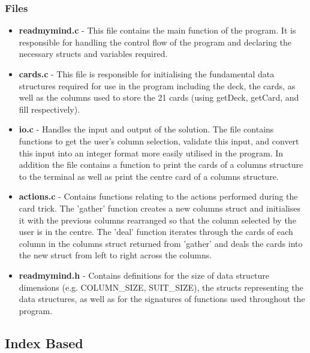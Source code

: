 \documentclass[11]{article}
\begin{document}
		\subsubsection{Files}
				\begin{itemize}
					\item \textbf{readmymind.c} - This file contains the main function of the program. It is responsible for handling the control flow of the program and declaring the necessary structs and variables required.
					\item \textbf{cards.c} - This file is responsible for initialising the fundamental data structures required for use in the program including the deck, the cards, as well as the columns used to store the 21 cards (using getDeck, getCard, and fill respectively).
					\item \textbf{io.c} - Handles the input and output of the solution. The file contains functions to get the user's column selection, validate this input, and convert this input into an integer format more easily utilised in the program. In addition the file contains a function to print the cards of a columns structure to the terminal as well as print the centre card of a columns structure.
					\item \textbf{actions.c} - Contains functions relating to the actions performed during the card trick. The 'gather' function creates a new columns struct and initialises it with the previous columns rearranged so that the column selected by the user is in the centre. The 'deal' function iterates through the cards of each column in the columns struct returned from 'gather' and deals the cards into the new struct from left to right across the columns.
					\item \textbf{readmymind.h} - Contains definitions for the size of data structure dimensions (e.g. COLUMN\_SIZE, SUIT\_SIZE), the structs representing the data structures, as well as for the signatures of functions used throughout the program.
				\end{itemize}
		\subsection{Index Based}
\end{document}
